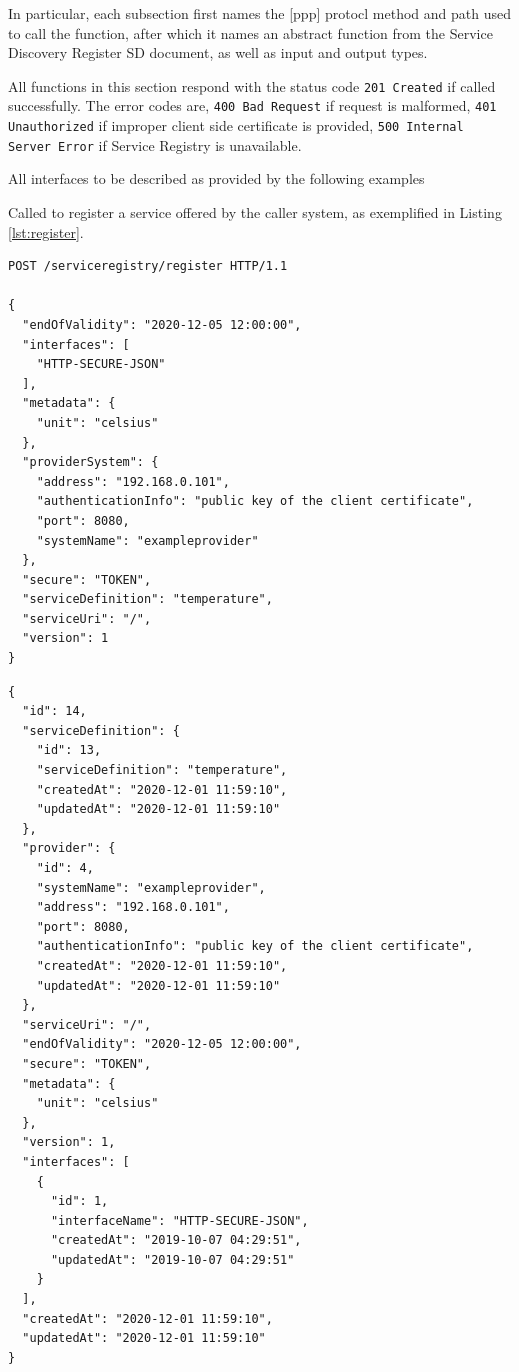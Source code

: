 \documentclass[a4paper]{arrowhead}
\newcommand{\fref}[1]{{\textcolor{ArrowheadBlue}{\hyperref[sec:functions:#1]{#1}}}}
\newcommand{\pref}[1]{{\textcolor{ArrowheadGrey}{\hyperref[sec:model:primitives:#1]{#1}}}}
\begin{document}
In particular, each subsection first names the [ppp] protocl method and path used to call the function, after which it names an abstract function from the Service Discovery Register SD document, as well as input and output types.

All functions in this section respond with the status code \texttt{201
  Created} if called successfully. The error codes are, \texttt{400
  Bad Request} if request is malformed, \texttt{401 Unauthorized} if
improper client side certificate is provided, \texttt{500 Internal
  Server Error} if Service Registry is unavailable.

\color{red}
All interfaces to be described as provided by the following examples

Called to register a service offered by the caller system, as exemplified in Listing \ref{lst:register}.

\begin{lstlisting}[language=http,label={lst:register},caption={A \fref{Register} invocation.}]
POST /serviceregistry/register HTTP/1.1

{
  "endOfValidity": "2020-12-05 12:00:00",
  "interfaces": [
    "HTTP-SECURE-JSON"
  ],
  "metadata": {
    "unit": "celsius"
  },
  "providerSystem": {
    "address": "192.168.0.101",
    "authenticationInfo": "public key of the client certificate",
    "port": 8080,
    "systemName": "exampleprovider"
  },
  "secure": "TOKEN",
  "serviceDefinition": "temperature",
  "serviceUri": "/",
  "version": 1
}
\end{lstlisting}

\begin{lstlisting}[language=http,label={lst:register_response},caption={A \fref{Register} response. Every \pref{Object} contains an id.}]
{
  "id": 14,
  "serviceDefinition": {
    "id": 13,
    "serviceDefinition": "temperature",
    "createdAt": "2020-12-01 11:59:10",
    "updatedAt": "2020-12-01 11:59:10"
  },
  "provider": {
    "id": 4,
    "systemName": "exampleprovider",
    "address": "192.168.0.101",
    "port": 8080,
    "authenticationInfo": "public key of the client certificate",
    "createdAt": "2020-12-01 11:59:10",
    "updatedAt": "2020-12-01 11:59:10"
  },
  "serviceUri": "/",
  "endOfValidity": "2020-12-05 12:00:00",
  "secure": "TOKEN",
  "metadata": {
    "unit": "celsius"
  },
  "version": 1,
  "interfaces": [
    {
      "id": 1,
      "interfaceName": "HTTP-SECURE-JSON",
      "createdAt": "2019-10-07 04:29:51",
      "updatedAt": "2019-10-07 04:29:51"
    }
  ],
  "createdAt": "2020-12-01 11:59:10",
  "updatedAt": "2020-12-01 11:59:10"
}
\end{lstlisting}
\end{document}
